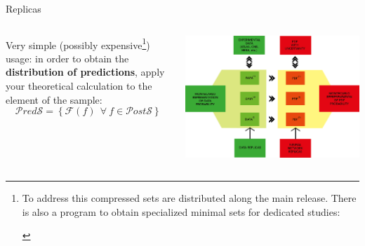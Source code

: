 \documentclass[9pt]{beamer}
\begin{document}
\begin{frame}{Replicas}
\begin{columns}
\begin{column}{0.4\textwidth}
            Very simple (possibly expensive\footnote{
                To address this compressed sets are distributed along the main
                release. There is also a program to obtain specialized minimal
                sets for dedicated studies:\newline
                \vspace*{-10pt}
                \begin{center}\end{center}
            }) usage: in order to obtain the \textbf{distribution of
            predictions}, apply your theoretical calculation to the element of
            the sample:
            \begin{equation*}
                \mathcal{P}red\mathcal{S} = \left\{
                    \mathcal{F}(f)~~\forall\ f \in \mathcal{P}ost\mathcal{S}
                \right\}
            \end{equation*}
            \vspace*{2pt}
        \end{column}
        \begin{column}{0.6\textwidth}
            \begin{tcolorbox}
                \includegraphics[width=\textwidth]{GS-1}
            \end{tcolorbox}
        \end{column}
    \end{columns}
\end{frame}
\end{document}
